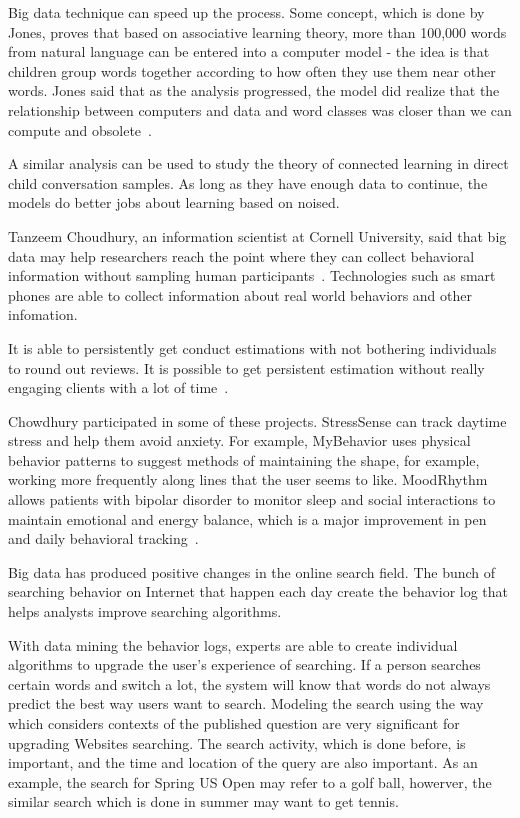 Big data technique can speed up the process. 
Some concept, which is done by Jones, proves that based on associative
 learning theory, more than 
100,000 words from natural language can be entered into a computer
 model - the idea is that children group words together according 
to how often they use them near other words. 
Jones said that as the
 analysis progressed, the model did realize that the relationship 
between computers and data and word classes was closer than we can 
compute and obsolete~\cite{hid515-00}.

 A similar analysis can be used to study
 the theory of connected learning in direct child conversation 
samples. As long as they have enough data to continue, the 
models do better jobs about learning based on noised.

Tanzeem Choudhury, an information scientist at Cornell University, 
said that big data may help researchers reach the point where they 
can collect behavioral information without sampling human 
participants~\cite{hid515-00}. Technologies such as smart phones are 
able to collect information about real world behaviors and other 
infomation.

It is able to persistently get conduct estimations with not 
bothering individuals to round out reviews. 
It is possible to get persistent estimation without really 
engaging clients with a lot of time~\cite{hid515-00}.

Chowdhury participated in some of these projects. StressSense can 
track 
daytime stress and help them avoid anxiety. For example, MyBehavior uses 
physical behavior patterns to suggest methods of maintaining the shape, for 
example, working more frequently along lines that the user seems to like. 
MoodRhythm allows patients with bipolar disorder to monitor 
sleep and social 
interactions to maintain emotional and energy balance, which is a major 
improvement in pen and daily behavioral tracking~\cite{hid515-00}. 

Big data has produced positive changes in the online search field. 
The bunch of searching behavior on Internet 
that happen each day create the behavior log that helps
analysts improve searching algorithms. 

With data mining the behavior logs, experts are able to create 
individual algorithms 
to upgrade the user's experience of searching. If a person searches
certain words and switch a lot, the system will know that words
 do not always predict the best way users want to search. 
Modeling the search using the way 
which considers contexts of the published question are very 
significant for 
upgrading Websites searching. 
The search activity, which is done before, is important, and the 
time and location of the query are also important. As an example, 
the search for Spring US Open may refer to a golf ball, 
howerver, the similar 
search which is done in summer may want to get tennis.

